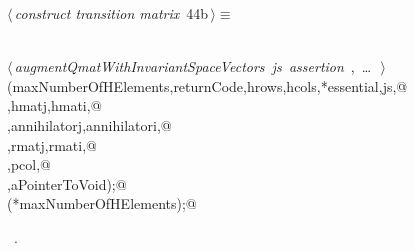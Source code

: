 \documentclass{article}
\begin{document}
\begin{flushleft} \small
\begin{minipage}{\linewidth}\label{scrap59}\raggedright\small
{} $\langle\,${\itshape construct transition matrix}\nobreak\ {\footnotesize {44b}}$\,\rangle\equiv$
\vspace{-1ex}
\begin{list}{}{} \item
\mbox{}\verb@@\\
\mbox{}\verb@@\hbox{$\langle\,${\itshape augmentQmatWithInvariantSpaceVectors js assertion}\nobreak\ {\footnotesize {}, \ldots\ }$\,\rangle$}\verb@@\\
\mbox{}\verb@constructA(maxNumberOfHElements,returnCode,hrows,hcols,*essential,js,@\\
\mbox{}\verb@hmat,hmatj,hmati,@\\
\mbox{}\verb@annihilator,annihilatorj,annihilatori,@\\
\mbox{}\verb@rmat,rmatj,rmati,@\\
\mbox{}\verb@prow,pcol,@\\
\mbox{}\verb@damat,aPointerToVoid);@\\
\mbox{}\verb@bumpSparseAim(*maxNumberOfHElements);@\\
\mbox{}\verb@@{\NWsep}
\end{list}
\vspace{-1.5ex}
\footnotesize
\begin{list}{}{\setlength{\itemsep}{-\parsep}\setlength{\itemindent}{-\leftmargin}}
\item \NWtxtMacroRefIn\ .

\end{list}
\end{minipage}
\end{flushleft}
\end{document}
